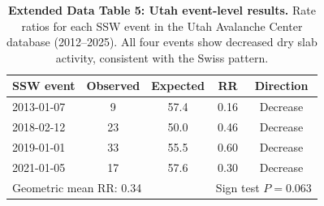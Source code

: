 \documentclass[11pt,letterpaper]{article}
\begin{document}
\begin{table}[!ht]
\centering
\caption{\textbf{Extended Data Table 5: Utah event-level results.}
Rate ratios for each SSW event in the Utah Avalanche Center database (2012--2025). All four events show decreased dry slab activity, consistent with the Swiss pattern.}
\label{tab:utah}
\small
\begin{tabular}{lcccc}
\toprule
SSW event & Observed & Expected & RR & Direction \\
\midrule
2013-01-07 & 9 & 57.4 & 0.16 & Decrease \\
2018-02-12 & 23 & 50.0 & 0.46 & Decrease \\
2019-01-01 & 33 & 55.5 & 0.60 & Decrease \\
2021-01-05 & 17 & 57.6 & 0.30 & Decrease \\
\midrule
\multicolumn{3}{l}{Geometric mean RR: 0.34} & \multicolumn{2}{l}{Sign test $P = 0.063$} \\
\bottomrule
\end{tabular}
\end{table}
\end{document}
